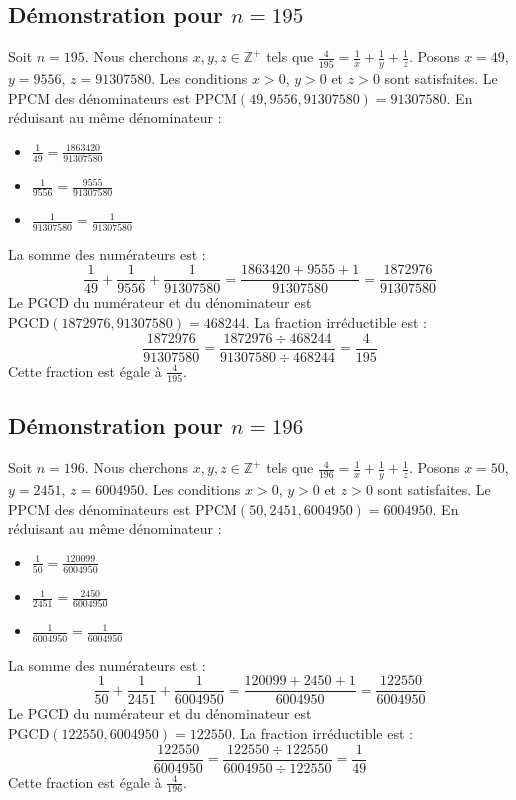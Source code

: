 \documentclass[11pt,a4paper]{article}
\begin{document}
\subsection{Démonstration pour $n = 195$}
Soit $n = 195$. Nous cherchons $x, y, z \in \mathbb{Z}^{+}$ tels que $\frac{4}{195} = \frac{1}{x} + \frac{1}{y} + \frac{1}{z}$.
Posons $x = 49$, $y = 9556$, $z = 91307580$.
Les conditions $x > 0$, $y > 0$ et $z > 0$ sont satisfaites.
Le PPCM des dénominateurs est $\text{PPCM}(49, 9556, 91307580) = 91307580$.
En réduisant au même dénominateur :
\begin{itemize}
    \item $\frac{1}{49} = \frac{1863420}{91307580}$
    \item $\frac{1}{9556} = \frac{9555}{91307580}$
    \item $\frac{1}{91307580} = \frac{1}{91307580}$
\end{itemize}
La somme des numérateurs est :
$$ \frac{1}{49} + \frac{1}{9556} + \frac{1}{91307580} = \frac{1863420 + 9555 + 1}{91307580} = \frac{1872976}{91307580} $$
Le PGCD du numérateur et du dénominateur est $\text{PGCD}(1872976, 91307580) = 468244$.
La fraction irréductible est :
$$ \frac{1872976}{91307580} = \frac{1872976 \div 468244}{91307580 \div 468244} = \frac{4}{195} $$
Cette fraction est égale à $\frac{4}{195}$.

\subsection{Démonstration pour $n = 196$}
Soit $n = 196$. Nous cherchons $x, y, z \in \mathbb{Z}^{+}$ tels que $\frac{4}{196} = \frac{1}{x} + \frac{1}{y} + \frac{1}{z}$.
Posons $x = 50$, $y = 2451$, $z = 6004950$.
Les conditions $x > 0$, $y > 0$ et $z > 0$ sont satisfaites.
Le PPCM des dénominateurs est $\text{PPCM}(50, 2451, 6004950) = 6004950$.
En réduisant au même dénominateur :
\begin{itemize}
    \item $\frac{1}{50} = \frac{120099}{6004950}$
    \item $\frac{1}{2451} = \frac{2450}{6004950}$
    \item $\frac{1}{6004950} = \frac{1}{6004950}$
\end{itemize}
La somme des numérateurs est :
$$ \frac{1}{50} + \frac{1}{2451} + \frac{1}{6004950} = \frac{120099 + 2450 + 1}{6004950} = \frac{122550}{6004950} $$
Le PGCD du numérateur et du dénominateur est $\text{PGCD}(122550, 6004950) = 122550$.
La fraction irréductible est :
$$ \frac{122550}{6004950} = \frac{122550 \div 122550}{6004950 \div 122550} = \frac{1}{49} $$
Cette fraction est égale à $\frac{4}{196}$.
\end{document}
